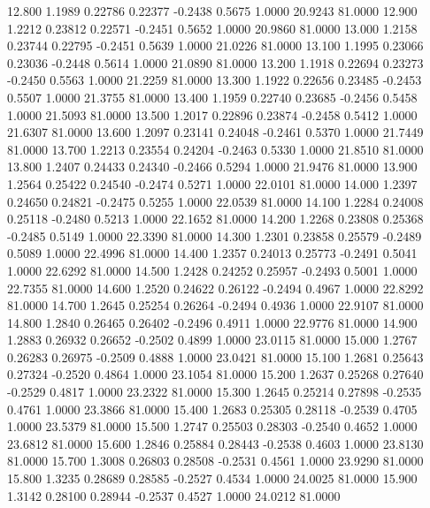   12.800   1.1989   0.22786   0.22377  -0.2438   0.5675   1.0000  20.9243  81.0000
  12.900   1.2212   0.23812   0.22571  -0.2451   0.5652   1.0000  20.9860  81.0000
  13.000   1.2158   0.23744   0.22795  -0.2451   0.5639   1.0000  21.0226  81.0000
  13.100   1.1995   0.23066   0.23036  -0.2448   0.5614   1.0000  21.0890  81.0000
  13.200   1.1918   0.22694   0.23273  -0.2450   0.5563   1.0000  21.2259  81.0000
  13.300   1.1922   0.22656   0.23485  -0.2453   0.5507   1.0000  21.3755  81.0000
  13.400   1.1959   0.22740   0.23685  -0.2456   0.5458   1.0000  21.5093  81.0000
  13.500   1.2017   0.22896   0.23874  -0.2458   0.5412   1.0000  21.6307  81.0000
  13.600   1.2097   0.23141   0.24048  -0.2461   0.5370   1.0000  21.7449  81.0000
  13.700   1.2213   0.23554   0.24204  -0.2463   0.5330   1.0000  21.8510  81.0000
  13.800   1.2407   0.24433   0.24340  -0.2466   0.5294   1.0000  21.9476  81.0000
  13.900   1.2564   0.25422   0.24540  -0.2474   0.5271   1.0000  22.0101  81.0000
  14.000   1.2397   0.24650   0.24821  -0.2475   0.5255   1.0000  22.0539  81.0000
  14.100   1.2284   0.24008   0.25118  -0.2480   0.5213   1.0000  22.1652  81.0000
  14.200   1.2268   0.23808   0.25368  -0.2485   0.5149   1.0000  22.3390  81.0000
  14.300   1.2301   0.23858   0.25579  -0.2489   0.5089   1.0000  22.4996  81.0000
  14.400   1.2357   0.24013   0.25773  -0.2491   0.5041   1.0000  22.6292  81.0000
  14.500   1.2428   0.24252   0.25957  -0.2493   0.5001   1.0000  22.7355  81.0000
  14.600   1.2520   0.24622   0.26122  -0.2494   0.4967   1.0000  22.8292  81.0000
  14.700   1.2645   0.25254   0.26264  -0.2494   0.4936   1.0000  22.9107  81.0000
  14.800   1.2840   0.26465   0.26402  -0.2496   0.4911   1.0000  22.9776  81.0000
  14.900   1.2883   0.26932   0.26652  -0.2502   0.4899   1.0000  23.0115  81.0000
  15.000   1.2767   0.26283   0.26975  -0.2509   0.4888   1.0000  23.0421  81.0000
  15.100   1.2681   0.25643   0.27324  -0.2520   0.4864   1.0000  23.1054  81.0000
  15.200   1.2637   0.25268   0.27640  -0.2529   0.4817   1.0000  23.2322  81.0000
  15.300   1.2645   0.25214   0.27898  -0.2535   0.4761   1.0000  23.3866  81.0000
  15.400   1.2683   0.25305   0.28118  -0.2539   0.4705   1.0000  23.5379  81.0000
  15.500   1.2747   0.25503   0.28303  -0.2540   0.4652   1.0000  23.6812  81.0000
  15.600   1.2846   0.25884   0.28443  -0.2538   0.4603   1.0000  23.8130  81.0000
  15.700   1.3008   0.26803   0.28508  -0.2531   0.4561   1.0000  23.9290  81.0000
  15.800   1.3235   0.28689   0.28585  -0.2527   0.4534   1.0000  24.0025  81.0000
  15.900   1.3142   0.28100   0.28944  -0.2537   0.4527   1.0000  24.0212  81.0000
